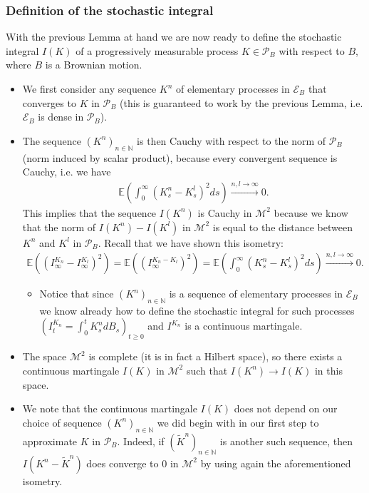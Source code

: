 \documentclass[../mainfile.tex]{subfiles}
\begin{document}
\subsubsection{Definition of the stochastic integral}
With the previous Lemma at hand we are now ready to define the stochastic integral $I(K)$ of a progressively measurable process $K \in \mathcal{P}_B$ with respect to $B$, where $B$ is a Brownian motion. 
\begin{itemize}
\item We first consider any sequence $K^n$ of elementary processes in $\mathcal{E}_B$ that converges to $K$ in $\mathcal{P}_B$ (this is guaranteed to work by the previous Lemma, i.e. $\mathcal{E}_B$ is dense in $\mathcal{P}_B$).
\item The sequence $(K^n)_{n \in \mathbb{N}}$ is then Cauchy with respect to the norm of $\mathcal{P}_B$ (norm induced by scalar product), because every convergent sequence is Cauchy, i.e. we have 
\begin{align*}
\mathbb{E}\left( \int_0^\infty (K_s^n-K_s^l)^2 ds \right) \xrightarrow{n,l \to \infty} 0.
\end{align*}
This implies that the sequence $I(K^n)$ is Cauchy in $\mathcal{M}^2$ because we know that the norm of $I(K^n)-I(K^l)$ in $\mathcal{M}^2$ is equal to the distance between $K^n$ and $K^l$ in $\mathcal{P}_B$. Recall that we have shown this isometry:
\begin{align*}
\mathbb{E}((I_\infty^{K_n}-I_\infty^{K_l})^2) = \mathbb{E}((I_\infty^{K_n-K_l})^2) = \mathbb{E}\left( \int_0^\infty (K_s^n-K_s^l)^2ds\right) \xrightarrow{n,l \to \infty} 0.
\end{align*}
\begin{itemize}
\item Notice that since $(K^n)_{n \in \mathbb{N}}$ is a sequence of elementary processes in $\mathcal{E}_B$ we know already how to define the stochastic integral for such processes $(I_t^{K_n}= \int_0^t K_s^n dB_s)_{t \geq 0}$ and $I^{K_n}$ is a continuous martingale. 
\end{itemize}
\item The space $\mathcal{M}^2$ is complete (it is in fact a Hilbert space), so there exists a continuous martingale $I(K)$ in $\mathcal{M}^2$ such that $I(K^n) \to I(K)$ in this space.
\item We note that the continuous martingale $I(K)$ does not depend on our choice of sequence $(K^n)_{n \in \mathbb{N}}$ we did begin with in our first step to approximate $K$ in $\mathcal{P}_B$. Indeed, if $(\tilde{K}^n)_{n \in \mathbb{N}}$ is another such sequence, then $I(K^n-\tilde{K}^n)$ does converge to $0$ in $\mathcal{M}^2$ by using again the aforementioned isometry. 
\end{itemize}
\end{document}
